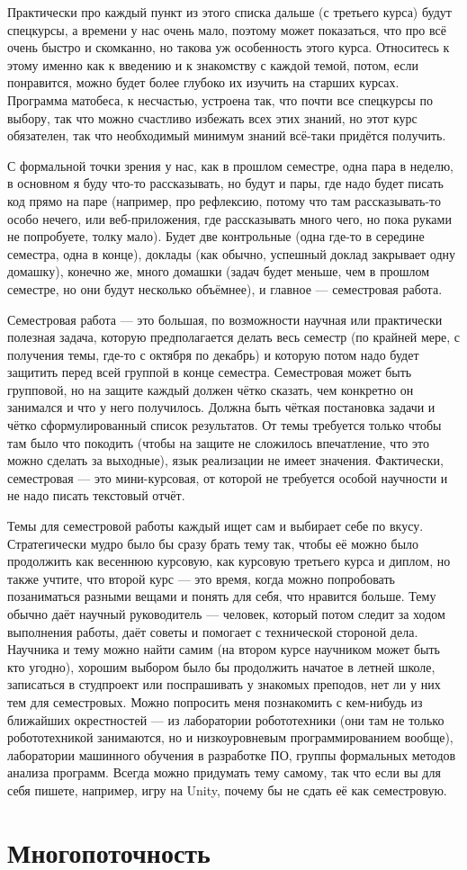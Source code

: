 \documentclass[a5paper]{article}
\begin{document}
Практически про каждый пункт из этого списка дальше (с третьего курса) будут спецкурсы, а времени у нас очень мало, поэтому может показаться, что про всё очень быстро и скомканно, но такова уж особенность этого курса. Относитесь к этому именно как к введению и к знакомству с каждой темой, потом, если понравится, можно будет более глубоко их изучить на старших курсах. Программа матобеса, к несчастью, устроена так, что почти все спецкурсы по выбору, так что можно счастливо избежать всех этих знаний, но этот курс обязателен, так что необходимый минимум знаний всё-таки придётся получить.

С формальной точки зрения у нас, как в прошлом семестре, одна пара в неделю, в основном я буду что-то рассказывать, но будут и пары, где надо будет писать код прямо на паре (например, про рефлексию, потому что там рассказывать-то особо нечего, или веб-приложения, где рассказывать много чего, но пока руками не попробуете, толку мало). Будет две контрольные (одна где-то в середине семестра, одна в конце), доклады (как обычно, успешный доклад закрывает одну домашку), конечно же, много домашки (задач будет меньше, чем в прошлом семестре, но они будут несколько объёмнее), и главное --- семестровая работа.

Семестровая работа --- это большая, по возможности научная или практически полезная задача, которую предполагается делать весь семестр (по крайней мере, с получения темы, где-то с октября по декабрь) и которую потом надо будет защитить перед всей группой в конце семестра. Семестровая может быть групповой, но на защите каждый должен чётко сказать, чем конкретно он занимался и что у него получилось. Должна быть чёткая постановка задачи и чётко сформулированный список результатов. От темы требуется только чтобы там было что покодить (чтобы на защите не сложилось впечатление, что это можно сделать за выходные), язык реализации не имеет значения. Фактически, семестровая --- это мини-курсовая, от которой не требуется особой научности и не надо писать текстовый отчёт.

Темы для семестровой работы каждый ищет сам и выбирает себе по вкусу. Стратегически мудро было бы сразу брать тему так, чтобы её можно было продолжить как весеннюю курсовую, как курсовую третьего курса и диплом, но также учтите, что второй курс --- это время, когда можно попробовать позаниматься разными вещами и понять для себя, что нравится больше. Тему обычно даёт научный руководитель --- человек, который потом следит за ходом выполнения работы, даёт советы и помогает с технической стороной дела. Научника и тему можно найти самим (на втором курсе научником может быть кто угодно), хорошим выбором было бы продолжить начатое в летней школе, записаться в студпроект или поспрашивать у знакомых преподов, нет ли у них тем для семестровых. Можно попросить меня познакомить с кем-нибудь из ближайших окрестностей --- из лаборатории робототехники (они там не только робототехникой занимаются, но и низкоуровневым программированием вообще), лаборатории машинного обучения в разработке ПО, группы формальных методов анализа программ. Всегда можно придумать тему самому, так что если вы для себя пишете, например, игру на Unity, почему бы не сдать её как семестровую.

\section{Многопоточность}
\end{document}
